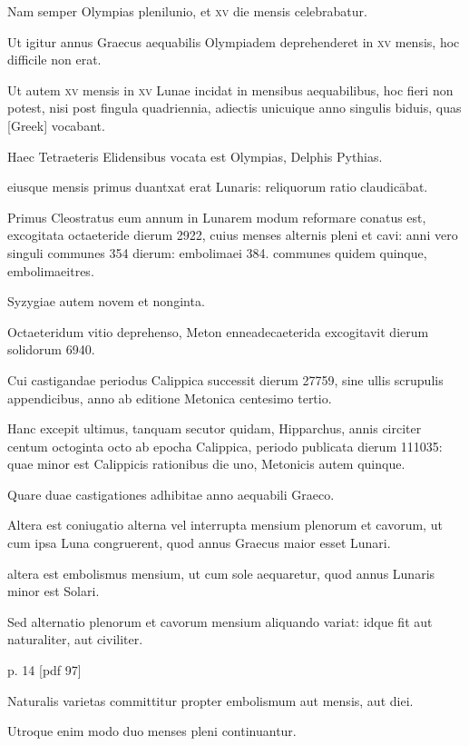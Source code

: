 Nam semper Olympias plenilunio, et \textsc{xv}
die mensis celebrabatur.

Ut igitur annus Graecus aequabilis Olympiadem
deprehenderet in \textsc{xv} mensis, hoc difficile non erat.

Ut autem
\textsc{xv} mensis in \textsc{xv}
 Lunae incidat in mensibus aequabilibus, hoc fieri non
potest, nisi post fingula quadriennia, adiectis unicuique anno singulis
biduis, quas \textgreek{[Greek]} vocabant.

Haec Tetraeteris Elidensibus
vocata est Olympias, Delphis Pythias.

eiusque mensis primus duantxat
erat Lunaris: reliquorum ratio claudicābat.

Primus Cleostratus
eum annum in Lunarem modum reformare conatus est, excogitata
octaeteride dierum 2922, cuius menses alternis pleni et cavi: anni vero
singuli communes 354 dierum: embolimaei 384. communes quidem
quinque, embolimaeitres.

Syzygiae autem novem et nonginta.

Octaeteridum
vitio deprehenso, Meton enneadecaeterida excogitavit dierum
solidorum 6940.

Cui castigandae periodus Calippica successit dierum
27759, sine ullis scrupulis appendicibus, anno ab editione Metonica
centesimo tertio.

Hanc excepit ultimus, tanquam secutor quidam,
Hipparchus, annis circiter centum octoginta octo ab epocha Calippica,
periodo publicata dierum 111035: quae minor est Calippicis rationibus
die uno, Metonicis autem quinque.

Quare duae castigationes adhibitae
anno aequabili Graeco.

Altera est coniugatio alterna vel interrupta
mensium plenorum et cavorum, ut cum ipsa Luna congruerent, quod
annus Graecus maior esset Lunari.

altera est embolismus mensium, ut
cum sole aequaretur, quod annus Lunaris minor est Solari.

Sed alternatio
plenorum et cavorum mensium aliquando variat: idque fit aut
naturaliter, aut civiliter.


p. 14 [pdf 97]

Naturalis varietas committitur propter embolismum
aut mensis, aut diei.

Utroque enim modo duo menses pleni continuantur.


